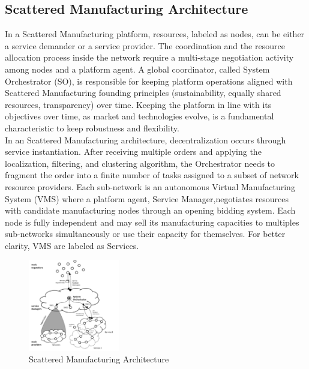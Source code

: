 \subsection{Scattered Manufacturing Architecture}
In a Scattered Manufacturing platform, resources, labeled as nodes, can be either a service demander or a service provider. The coordination and the resource allocation process inside the network require a multi-stage negotiation activity among nodes and a platform agent. A global coordinator, called System Orchestrator (SO), is responsible for keeping platform operations aligned with Scattered Manufacturing founding principles (sustainability, equally shared resources, transparency) over time. Keeping the platform in line with its objectives over time, as market and technologies evolve, is a fundamental characteristic to keep robustness and flexibility.\\
In an Scattered Manufacturing architecture, decentralization occurs through service instantiation. After receiving multiple orders and applying the localization, filtering, and clustering algorithm, the Orchestrator needs to fragment the order into a finite number of tasks assigned to a subset of network resource providers. Each sub-network is an autonomous Virtual Manufacturing System (VMS) where a platform agent, Service Manager,negotiates resources with candidate manufacturing nodes through an opening bidding system. Each node is fully independent and may sell its manufacturing capacities to multiples sub-networks simultaneously or use their capacity for themselves. For better clarity, VMS are labeled as Services.
\begin{figure}
    \centering
    \includegraphics[height=4cm, keepaspectratio]{images/scattered-mfg-architecture}
    \caption{Scattered Manufacturing Architecture}
    \label{fig:smfg-architecture}
\end{figure}
